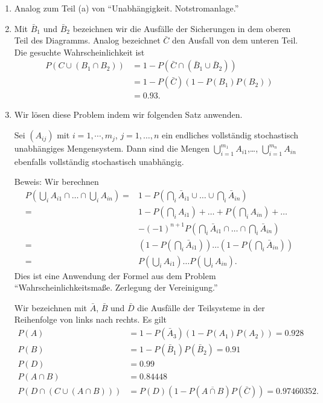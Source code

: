 \solution
\begin{enumerate}
    \item Analog zum Teil (a) von ``Unabhängigkeit. Notstromanlage.''
    \item Mit $\bar B_1$ und $\bar B_2$ bezeichnen wir die Ausfälle der 
        Sicherungen in dem oberen Teil des Diagramms. Analog bezeichnet
        $\bar C$ den Ausfall von dem unteren Teil. Die gesuchte Wahrscheinlichkeit
        ist
        \begin{align*}
            P( C \cup (B_1 \cap B_2 )) &= 1 - P( \bar C \cap ( \bar B_1 \cup \bar B_2)) \\
            &= 1 - P(\bar C)\left( 1- P(B_1)P(B_2) \right) \\
            &= 0.93.
        \end{align*}
    \item Wir lösen diese Problem indem wir folgenden Satz anwenden. 

        Sei $(A_{ij})$ mit $i=1, \cdots, m_{j}$, $j=1,\dots ,n$ ein
        endliches vollständig stochastisch unabhängiges Mengensystem. Dann
        sind die Mengen $\bigcup_{i=1}^{m_1} A_{i 1}$,\ldots,
        $\bigcup_{i=1}^{m_n} A_{i n}$ ebenfalls vollständig stochastisch
        unabhängig. 
        
        Beweis: Wir berechnen 
        \begin{align*}
            P\left( \bigcup_{i} A_{i 1} \cap \dots \cap \bigcup_{i} A_{i n} \right) =& 
            1 - P \left(  \bigcap_{i} \bar A_{i 1} \cup \dots \cup \bigcap_{i} \bar A_{i n} \right) \\
            =& 1 - P(\bigcap_{i} A_{i1}) + \dots + P(\bigcap_{i} A_{i n}) + \dots \\ 
            & - (-1)^{n+1}
            P\left(   \bigcap_{i} \bar A_{i 1} \cap \dots \cap \bigcap_{i} \bar A_{i n} \right) \\
            =& \left( 1 - P( \bigcap_{i} \bar A_{i 1} ) \right)\dots \left( 1-P( \bigcap_{i} \bar A_{i n}  ) \right) \\
            =& P( \bigcup_{i} A_{i 1} ) \dots P( \bigcup_{i} A_{i n} ).
        \end{align*}
        Dies ist eine Anwendung der Formel aus dem Problem ``Wahrscheinlichkeitsmaße. Zerlegung der Vereinigung.''

        Wir bezeichnen mit $\bar A$, $\bar B$ und $\bar D$ die Ausfälle der Teilsysteme in der Reihenfolge
        von links nach rechts. Es gilt
        \begin{align*}
            P(A) &= 1 - P(\bar A_3)(1- P(A_1)P(A_2)) = 0.928 \\
            P(B) &= 1 - P(\bar B_1 ) P(\bar B_2) = 0.91    \\
            P(D) &= 0.99 \\
            P(A\cap B) &= 0.84448 \\
            P( D \cap ( C \cup (A \cap B))) &= P( D )( 1- P(\overline{ A \cap B }) P( \bar C )) = 0.97460352.
        \end{align*}
\end{enumerate}


